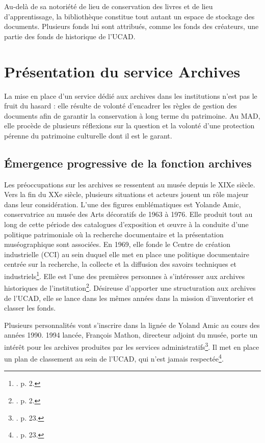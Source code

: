 Au-delà de sa notoriété de lieu de conservation des livres et de lieu d’apprentissage, la bibliothèque constitue tout autant un espace de stockage des documents. Plusieurs fonds lui sont attribués, comme les fonds des créateurs, une partie des fonds de historique de l’UCAD.


\section{Présentation du service Archives}

La mise en place d'un service dédié aux archives dans les institutions n'est pas le fruit du hasard : elle résulte de volonté d'encadrer les règles de gestion des documents afin de garantir la conservation à long terme du patrimoine. Au MAD, elle procède de plusieurs réflexions sur la question et la volonté d'une protection pérenne du patrimoine culturelle dont il est le garant.

\subsection*{Émergence progressive de la fonction archives}

Les préoccupations sur les archives se ressentent au musée depuis le XIXe siècle. Vers la fin du XXe siècle, plusieurs situations et acteurs jouent un rôle majeur dans leur considération. L’une des figures emblématiques est Yolande Amic, conservatrice au musée des Arts décoratifs de 1963 à 1976. Elle produit tout au long de cette période des catalogues d’exposition et œuvre à la conduite d’une politique patrimoniale où la recherche documentaire et la présentation muséographique sont associées. En 1969, elle fonde le Centre de création industrielle (CCI) au sein duquel elle met en place une politique documentaire centrée sur la recherche, la collecte et la diffusion des savoirs techniques et industriels\footnote{\cite{siguret-repertoire-2001}. p. 2.}. Elle est l’une des premières personnes à s’intéresser aux archives historiques de l’institution\footnote{\cite{siguret-repertoire-2001}. p. 2.}. Désireuse d’apporter une structuration aux archives de l’UCAD, elle se lance dans les mêmes années dans la mission d’inventorier et classer les fonds.

Plusieurs personnalités vont s'inscrire dans la lignée de Yoland Amic au cours des années 1990. 1994 lancée, François Mathon, directeur adjoint du musée, porte un intérêt pour les archives produites par les services administratifs\footnote{\cite{krezidou-2021}. p. 23.}. Il met en place un plan de classement au sein de  l’UCAD, qui n'est jamais respectée\footnote{\cite{krezidou-2021}. p. 23.}.\\[0.2cm]

